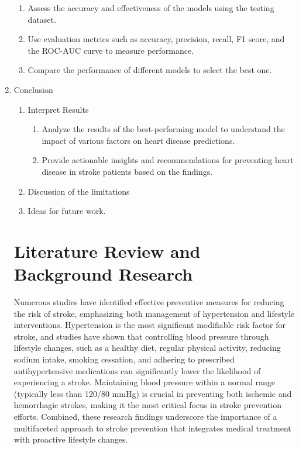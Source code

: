 \documentclass[runningheads]{llncs}
\begin{document}
\begin{enumerate}
\begin{enumerate}
    \item Assess the accuracy and effectiveness of the models using the testing dataset. 
    \item Use evaluation metrics such as accuracy, precision, recall, F1 score, and the ROC-AUC curve to measure performance. 
    \item Compare the performance of different models to select the best one. 
\end{enumerate}
\item Conclusion
\begin{enumerate}
    \item Interpret Results
        \begin{enumerate}
            \item Analyze the results of the best-performing model to understand the impact of various factors on heart disease predictions. 
            \item Provide actionable insights and recommendations for preventing heart disease in stroke patients based on the findings. 
        \end{enumerate}
\item Discussion of the limitations
\item Ideas for future work.
\end{enumerate}

\section{Literature Review and Background Research}
Numerous studies have identified effective preventive measures for reducing the risk of stroke, emphasizing both management of hypertension and lifestyle interventions. Hypertension is the most significant modifiable risk factor for stroke, and studies have shown that controlling blood pressure through lifestyle changes, such as a healthy diet, regular physical activity, reducing sodium intake, smoking cessation, and adhering to prescribed antihypertensive medications can significantly lower the likelihood of experiencing a stroke. Maintaining blood pressure within a normal range (typically less than 120/80 mmHg) is crucial in preventing both ischemic and hemorrhagic strokes, making it the most critical focus in stroke prevention efforts. Combined, these research findings underscore the importance of a multifaceted approach to stroke prevention that integrates medical treatment with proactive lifestyle changes.


\end{enumerate}
\end{document}
